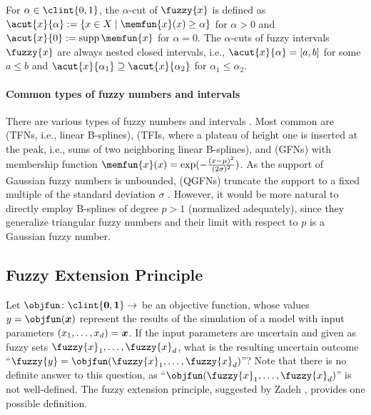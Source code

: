 For $\alpha \in \clint{0, 1}$, the $\alpha$-cut of $\fuzzy{x}$ is
defined as $\acut{x}{\alpha} := \{x \in X \mid \memfun{x}(x) \ge \alpha\}$
for $\alpha > 0$ and $\acut{x}{0} := \supp \memfun{x}$ for $\alpha = 0$.
The $\alpha$-cuts of fuzzy intervals $\fuzzy{x}$ are always
nested closed intervals, i.e.,
$\acut{x}{\alpha} = [a, b]$ for some $a \le b$ and
$\acut{x}{\alpha_1} \supset \acut{x}{\alpha_2}$ for $\alpha_1 \le \alpha_2$.

\paragraph{Common types of fuzzy numbers and intervals}

There are various types of fuzzy numbers and intervals
\cite{Klimke06Uncertainty}.
Most common are
 (TFNs, i.e., linear B-splines),
(TFIs, where a plateau of height one is inserted at the peak, i.e.,
sums of two neighboring linear B-splines), and
 (GFNs) with membership function
$\memfun{x}(x) = \exp(-\frac{(x - \mu)^2}{(2\sigma)^2})$.
As the support of Gaussian fuzzy numbers is unbounded,
 (QGFNs) truncate the support
to a fixed multiple of the standard deviation $\sigma$
\cite{Klimke06Uncertainty}.
However, it would be more natural to directly employ B-splines of
degree $p > 1$ (normalized adequately), since they generalize
triangular fuzzy numbers and their limit with respect to $p$
is a Gaussian fuzzy number.



\subsection{Fuzzy Extension Principle}
\label{sec:552fuzzyExtensionPrinciple}

Let $\objfun\colon \clint{\*0, \*1} \to \real$ be an objective function,
whose values $y = \objfun(\*x)$ represent the results of the
simulation of a model with input parameters $(x_1, \dotsc, x_d) = {\boldsymbol{x}}$.
If the input parameters are uncertain and
given as fuzzy sets $\fuzzy{x}_1, \dotsc, \fuzzy{x}_d$,
what is the resulting uncertain outcome
``$\fuzzy{y} = \objfun(\fuzzy{x}_1, \dotsc, \fuzzy{x}_d)$''?
Note that there is no definite answer to this question,
as ``$\objfun(\fuzzy{x}_1, \dotsc, \fuzzy{x}_d)$'' is not well-defined.
The fuzzy extension principle, suggested by Zadeh \cite{Zadeh75Concept},
provides one possible definition.

